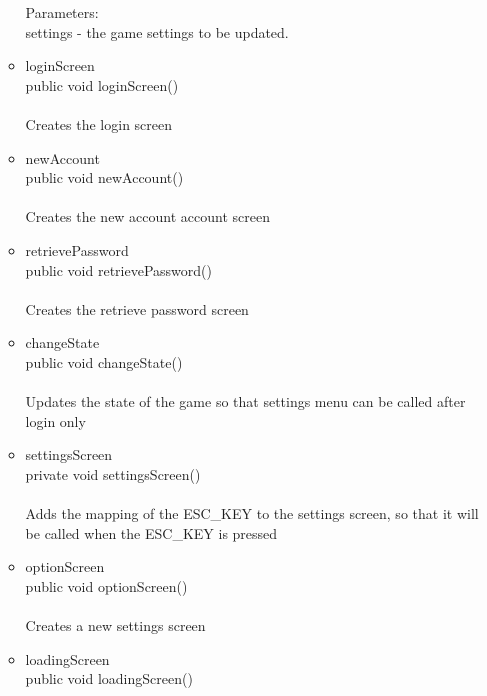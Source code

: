 \documentclass[letterpaper]{article}
\begin{document}
\begin{itemize}
\begin{itemize}
		Parameters: \\
		    settings - the game settings to be updated.  \\
		
		
		
		\item	loginScreen \\
															public void loginScreen() \\ \\
															Creates the login screen \\	
													\item	newAccount \\
															public void newAccount() \\ \\ 
															Creates the new account account screen \\
													\item	retrievePassword \\
															public void retrievePassword() \\ \\
															Creates the retrieve password screen \\
													\item	changeState \\
															public void changeState() \\ \\
															Updates the state of the game so that settings menu can be called after login only \\
													\item	settingsScreen \\
															private void settingsScreen() \\ \\
															Adds the mapping of the ESC\_KEY to the settings screen, so that it will be called when the ESC\_KEY is pressed \\
													\item	optionScreen \\
															public void optionScreen() \\ \\
															Creates a new settings screen \\
													\item	loadingScreen \\
															public void loadingScreen() \\ \\

\end{itemize}
\end{itemize}
\end{document}
